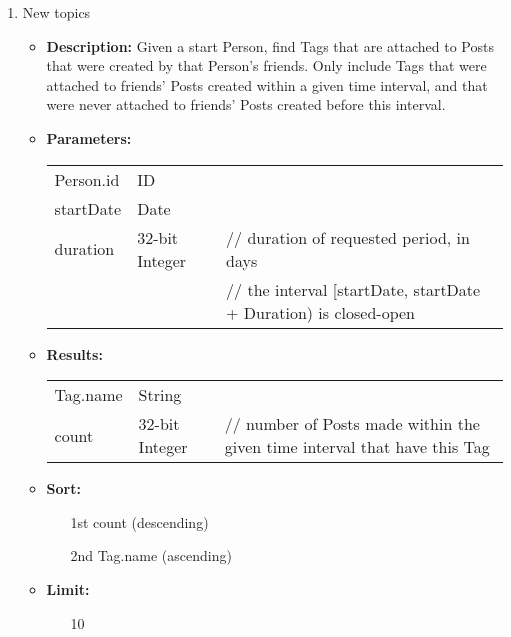 {\begin{enumerate}
        \item New topics
            \begin{itemize}
                \item \textbf{Description:}
                    Given a start Person, find Tags that are attached to Posts that
                    were created by that Person's friends.  Only include Tags that were
                    attached to friends' Posts created within a given time interval, and that
                    were never attached to friends' Posts created before this interval.  
                \item \textbf{Parameters:} \\
                    \begin{tabular}{lll}
                        Person.id 										& ID 	& \\
                        startDate 										& Date & \\
                        duration										& 32-bit Integer 					& // duration of requested period, in days \\
                                          &                                   & // the interval [startDate, startDate + Duration) is closed-open\\
                    \end{tabular} 
                \item \textbf{Results:} \\
                    \begin{tabular}{lll}
                        Tag.name 										& String 	& \\
                        count 											& 32-bit Integer & // number of Posts made within the given time interval that have this Tag \\
                    \end{tabular}		
                \item \textbf{Sort:}
                  \begin{itemize}
                    \item[1st] count (descending)
                    \item[2nd] Tag.name (ascending)
                  \end{itemize}
                        \item \textbf{Limit:}
                          \begin{itemize}
                            \item[] 10 
                          \end{itemize}
            \end{itemize}


\end{enumerate}}
